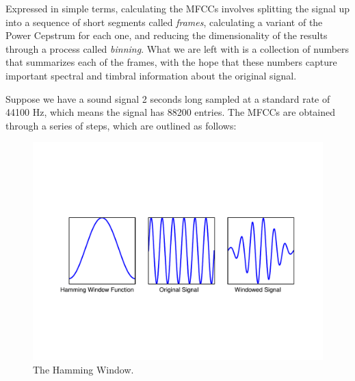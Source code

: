 Expressed in simple terms, calculating the MFCCs involves splitting the signal up into a sequence of
short segments called \emph{frames}, calculating a variant of the Power Cepstrum for each one,
and reducing the dimensionality of the results through a process called \emph{binning}. What we are
left with is a collection of numbers that summarizes each of the frames, with the hope that these
numbers capture important spectral and timbral information about the original signal.

Suppose we have a sound signal 2 seconds long sampled at a standard rate of 44100 Hz, which means the
signal has 88200 entries. The  MFCCs are obtained through a series of steps, which are outlined
as follows:
\begin{figure}
\centering
\includegraphics[width=\textwidth]{Hamming.pdf}
\caption{The Hamming Window.}
\label{fourierext:ham}
\end{figure}

